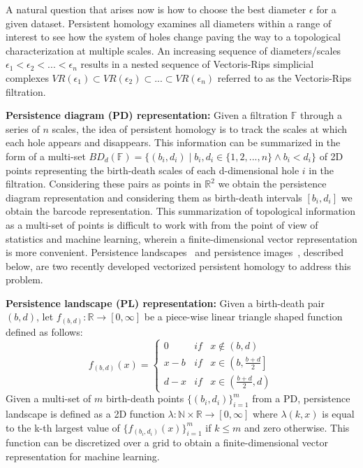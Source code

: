 \documentclass{article}
\begin{document}
\noindent A natural question that arises now is how to choose the best diameter $\epsilon$ for a given dataset. Persistent homology examines all diameters within a range of interest to see how the system of holes change paving the way to a topological characterization at multiple scales. An increasing sequence of diameters/scales $\epsilon_1 < \epsilon_2 < ... < \epsilon_n$ results in a nested sequence of Vectoris-Rips simplicial complexes $VR(\epsilon_1) \subset VR(\epsilon_2) \subset ... \subset VR(\epsilon_n)$ referred to as the Vectoris-Rips filtration.

\smallskip
\noindent \textbf{Persistence diagram (PD) representation:} Given a filtration $\mathbb{F}$ through a series of $n$ scales, the idea of persistent homology is to track the scales at which each hole appears and disappears. This information can be summarized in the form of a multi-set $BD_d(\mathbb{F}) = \{(b_i, d_i) \mid b_i, d_i \in \{1, 2, ..., n\} \land b_i < d_i \}$ of 2D points representing the birth-death scales of each d-dimensional hole $i$ in the filtration. Considering these pairs as points in $\mathbb{R}^2$ we obtain the persistence diagram representation and considering them as birth-death intervals $[b_i, d_i]$ we obtain the barcode representation. This summarization of topological information as a multi-set of points is difficult to work with from the point of view of statistics and machine learning, wherein a finite-dimensional vector representation is more convenient. Persistence landscapes~\cite{Adams2015} and persistence images~\cite{Bubenik2012}, described below, are two recently developed vectorized persistent homology to address this problem.

\smallskip 
\noindent \textbf{Persistence landscape (PL) representation:} Given a birth-death pair $(b,d)$, let $f_{(b,d)}: \mathbb{R} \to [0, \infty]$ be a piece-wise linear triangle shaped function defined as follows:
\begin{equation}
f_{(b,d)}\left ( x \right ) = \left\{\begin{array}{lll}
 0 & if & x \notin \left(b,d\right)\\ 
 x - b & if & x \in \left(b, \frac{b + d}{2}\right]\\ 
 d - x & if & x \in \left(\frac{b + d}{2}, d\right)
\end{array}\right.    
\end{equation}
Given a multi-set of $m$ birth-death points $\{(b_i, d_i)\}_{i=1}^{m}$ from a PD, persistence landscape is defined as a 2D function $\lambda : \mathbb{N} \times \mathbb{R} \to [0, \infty]$ where $\lambda(k, x)$ is equal to the k-th largest value of $\{f_{(b_i, d_i)}\left(x\right)\}_{i=1}^{m}$ if $k \leq m$ and zero otherwise. This function can be discretized over a grid to obtain a finite-dimensional vector representation for machine learning.
\end{document}
